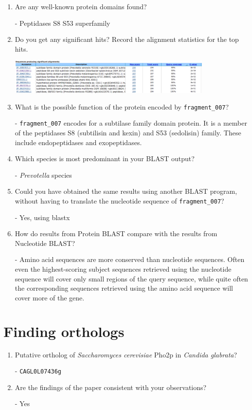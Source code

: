 \documentclass[a4paper,11pt]{article}
\begin{document}
\begin{enumerate}
\item Are any well-known protein domains found? 

- Peptidases S8 S53 superfamily

\item Do you get any significant hits? Record the alignment statistics for the top hits. 

\vspace{0.5cm}
\begin{center}
\includegraphics[width=0.8\textwidth]{blastp.png}
\end{center}
\vspace{0.5cm}

\item What is the possible function of the protein encoded by \texttt{fragment\_007}?

- \texttt{fragment\_007} encodes for a subtilase family domain protein. It is a member of the peptidases S8 (subtilisin and kexin) and S53 (sedolisin) family. These include endopeptidases and exopeptidases.

\item Which species is most predominant in your BLAST output?

- \emph{Prevotella} species

\item Could you have obtained the same results using another BLAST program, without having to translate the nucleotide sequence of \texttt{fragment\_007}?

- Yes, using blastx

\item How do results from Protein BLAST compare with the results from Nucleotide BLAST?

- Amino acid sequences are more conserved than nucleotide sequences. Often even the highest-scoring subject sequences retrieved using the nucleotide sequence will cover only small regions of the query sequence, while quite often the corresponding sequences retrieved using the amino acid sequence will cover more of the gene.

\end{enumerate}

\section{Finding orthologs}
\begin{enumerate}
\item Putative ortholog of \emph{Saccharomyces cerevisiae} Pho2p in \emph{Candida glabrata}?

- \texttt{CAGL0L07436g}

\item Are the findings of the paper consistent with your observations?

- Yes
\end{enumerate}
\end{document}
